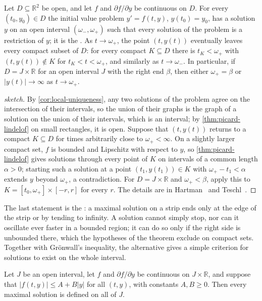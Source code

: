 \begin{theorem}
\label{thm:maximal-solution}
Let $D\subseteq\mathbb R^2$ be open, and let $f$ and $\partial f/\partial y$ be continuous on $D$. For every $(t_0,y_0)\in D$ the initial value problem $y'=f(t,y)$, $y(t_0)=y_0$, has a solution $y$ on an open interval $(\omega_-,\omega_+)$ such that every solution of the problem is a restriction of $y$; it is the . As $t\to\omega_+$, the point $(t,y(t))$ eventually leaves every compact subset of $D$: for every compact $K\subseteq D$ there is $t_K<\omega_+$ with $(t,y(t))\notin K$ for $t_K<t<\omega_+$, and similarly as $t\to\omega_-$. In particular, if $D=J\times\mathbb R$ for an open interval $J$ with the right end $\beta$, then either $\omega_+=\beta$ or $|y(t)|\to\infty$ as $t\to\omega_+$.
\end{theorem}

\begin{proof}[sketch]
By \cref{cor:local-uniqueness}, any two solutions of the problem agree on the intersection of their intervals, so the union of their graphs is the graph of a solution on the union of their intervals, which is an interval; by \cref{thm:picard-lindelof} on small rectangles, it is open. Suppose that $(t,y(t))$ returns to a compact $K\subseteq D$ for times arbitrarily close to $\omega_+<\infty$. On a slightly larger compact set, $f$ is bounded and Lipschitz with respect to $y$, so \cref{thm:picard-lindelof} gives solutions through every point of $K$ on intervals of a common length $\alpha>0$; starting such a solution at a point $(t_1,y(t_1))\in K$ with $\omega_+-t_1<\alpha$ extends $y$ beyond $\omega_+$, a contradiction. For $D=J\times\mathbb R$ and $\omega_+<\beta$, apply this to $K=[t_0,\omega_+]\times[-r,r]$ for every $r$. The details are in Hartman~\cite[Chap.~II]{hartman2002} and Teschl~\cite[Chap.~2]{teschl2012}.
\end{proof}

The last statement is the : a maximal solution on a strip ends only at the edge of the strip or by tending to infinity. A solution cannot simply stop, nor can it oscillate ever faster in a bounded region; it can do so only if the right side is unbounded there, which the hypotheses of the theorem exclude on compact sets. Together with Gr\"onwall's inequality, the alternative gives a simple criterion for solutions to exist on the whole interval.

\begin{corollary}
\label{cor:global-existence}
Let $J$ be an open interval, let $f$ and $\partial f/\partial y$ be continuous on $J\times\mathbb R$, and suppose that $|f(t,y)|\le A+B|y|$ for all $(t,y)$, with constants $A,B\ge0$. Then every maximal solution is defined on all of $J$.
\end{corollary}

